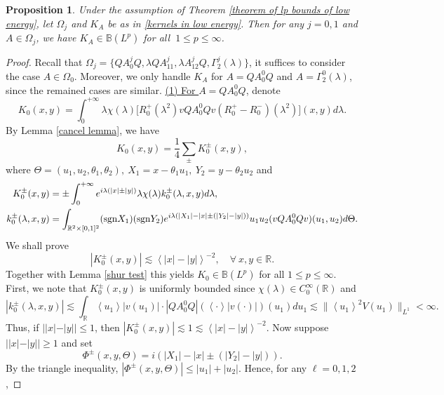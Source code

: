 \documentclass[reqno]{amsart}
\newtheorem{proposition}[definition]{Proposition}
\newcommand\R{\mathbb{R}}
\newcommand\B{\mathbb{B}}
\numberwithin{equation}{section}
\begin{document}
\begin{proposition}\label{good1}
Under the assumption of Theorem {\rm\ref{theorem of lp bounds of low energy}}, let $\Omega_j$ and $K_A$ be as in \eqref{kernels in low energy}. Then for any $j=0,1$ and $A\in\Omega_j$, we have $K_A\in\B(L^p)$ for all $\ 1\leq p\leq\infty$.
\end{proposition}
\begin{proof} Recall that $\Omega_j=\{QA^j_0Q,\lambda QA^j_{11},\lambda A^j_{12}Q,  \Gamma^j_2(\lambda)\}$, it suffices to consider the case $A\in\Omega_0$. Moreover, we only handle $K_A$ for $A=QA^0_0Q$ and $A=\Gamma^0_2(\lambda)$, since the remained cases are similar.
\vskip0.2cm
\underline{(1) For $A=QA^0_0Q$}, denote
\begin{equation*}
K_0(x,y)=\int_{0}^{+\infty}\lambda\chi(\lambda)\big[R^+_0(\lambda^{2})vQA^0_0Qv(R^+_0-R^-_0)(\lambda^{2})\big](x,y)d\lambda.
\end{equation*}
By Lemma \ref{cancel lemma}, we have 
\begin{equation*}
    K_0(x,y)=\frac{1}{4}\sum\limits_{\pm}K^{\pm}_0(x,y),
\end{equation*}
where $\Theta=(u_1,u_2,\theta_1,\theta_2),\ X_1=x-\theta_1u_1,\ Y_2=y-\theta_2u_2$ and 
\begin{align*}
K^{\pm}_0(x,y)&=\pm\int_{0}^{+\infty}e^{i\lambda(|x|\pm|y|)}\lambda\chi(\lambda)k^{\pm}_0(\lambda,x,y)d\lambda,\\
k^{\pm}_0(\lambda,x,y)&=\int_{\R^2\times[0,1]^2}({\rm sgn}X_1)({\rm sgn}Y_2)e^{i\lambda(|X_1|-|x|\pm (|Y_2|-|y|))}u_1u_2(vQA^0_0Qv)(u_1,u_2)d\Theta.
\end{align*}
We shall prove \begin{equation}\label{esti of Kpm0}
    |K^{\pm}_{0}(x,y)|\lesssim\left<|x|-|y|\right>^{-2},\quad \forall\  x,y\in \R.
\end{equation}
Together with Lemma \ref{shur test} this yields $K_0\in \B(L^p)$ for all $1\leq p\leq\infty$. First, we note that $K^{\pm}_0(x,y)$ is uniformly bounded since $\chi(\lambda)\in C^{\infty}_0(\R)$ and 
\begin{equation*}
|k^{\pm}_0(\lambda,x,y)|\lesssim \int_{\R}\left<u_1\right>|v(u_1)|\cdot |QA^0_0Q|(\left<\cdot\right>|v(\cdot)|)(u_1)du_1 \lesssim\|\left<u_1\right>^2V(u_1)\|_{L^1} <\infty. 
\end{equation*}
Thus, if $||x|-|y||\leq1$, then $|K^{\pm}_{0}(x,y)|\lesssim1\lesssim\left<|x|-|y|\right>^{-2}.$ Now suppose $||x|-|y||\geq1$ and set $$\Phi^{\pm}(x,y,\Theta)=i(|X_1|-|x|\pm (|Y_2|-|y|)).$$
By the triangle inequality, $\left|\Phi^{\pm}(x,y,\Theta)\right|\leq |u_1|+|u_2|$. Hence, for any $\ell=0,1,2$, 

\end{proof}
\end{document}
